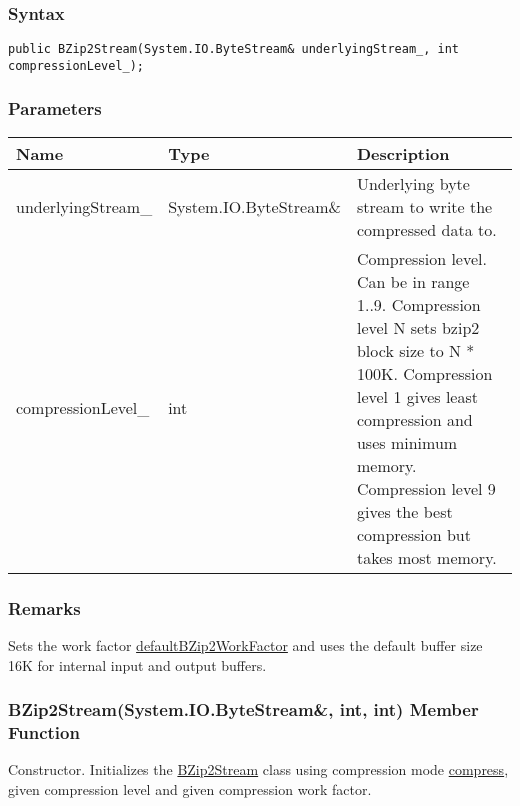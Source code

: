 \documentclass[a4paper,oneside,11.000000pt]{book}
\begin{document}
\subsubsection*{Syntax}
\texttt{public BZip2Stream(System.IO.ByteStream\& underlyingStream\_, int compressionLevel\_);}
\subsubsection*{Parameters}
\begin{flushleft}
\begin{supertabular}[l]{!{\raggedright}p{4.10323cm}!{\raggedright}p{5.76344cm}!{\raggedright}p{4.93333cm}}
\textbf{Name}
& \textbf{Type}
& \textbf{Description}
\\
\hline
underlyingStream\_
& System.\-IO.\-ByteStream\&\-
& Underlying byte stream to write the compressed data to.

\\
compressionLevel\_
& int
& Compression level. Can be in range 1..9. Compression level N sets bzip2 block size to N * 100K. Compression level 1 gives least compression and uses minimum memory.
Compression level 9 gives the best compression but takes most memory.

\\
\end{supertabular}

\end{flushleft}
\subsubsection*{Remarks}
\begin{flushleft}
Sets the work factor \hyperlink{System.IO.Compression.defaultBZip2WorkFactor}{defaultBZip2WorkFactor} and uses the default buffer size 16K for internal input and output buffers.

\end{flushleft}
\clearpage

\hypertarget{System.IO.Compression.BZip2Stream.constructor.P.System.IO.Compression.BZip2Stream.R.System.IO.ByteStream.int.int}{\subsubsection*{BZip2Stream(System.IO.ByteStream\&, int, int) Member Function}}
\begin{flushleft}
Constructor. Initializes the \hyperlink{System.IO.Compression.BZip2Stream}{BZip2Stream} class using compression mode \hyperlink{System.IO.Compression.CompressionMode.compress}{compress}, 
given compression level and given compression work factor.

\end{flushleft}
\end{document}
